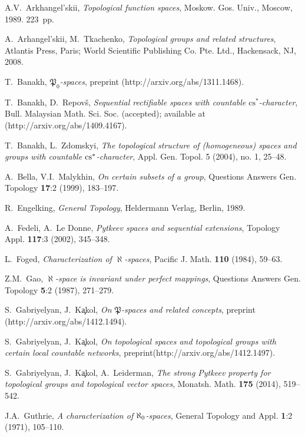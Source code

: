 \documentclass{amsart}
\theoremstyle{definition}
\begin{document}
\begin{thebibliography}{}

  A.V.~Arkhangel'skii, {\em Topological function spaces}, Moskow. Gos. Univ., Moscow, 1989. 223~pp.

 A.~Arhangel'skii, M.~Tkachenko, {\em Topological groups and related structures},  Atlantis Press, Paris; World Scientific Publishing Co. Pte. Ltd., Hackensack, NJ, 2008.

 T.~Banakh, {\em ${\mathfrak P}_0$-spaces}, preprint (http://arxiv.org/abs/1311.1468).

 T.~Banakh, D.~Repov\v s, {\em Sequential rectifiable spaces with countable ${\mathrm{cs}}^*$-character}, Bull. Malaysian Math. Sci. Soc. (accepted); available at (http://arxiv.org/abs/1409.4167).

 T.~Banakh, L.~Zdomskyi, {\em The topological structure of (homogeneous) spaces and groups with countable $\rm cs\sp *$-character}, Appl. Gen. Topol. 5 (2004), no. 1, 25--48.

 A.~Bella, V.I.~Malykhin, {\em On certain subsets of a group}, Questions Answers Gen. Topology {\bf 17}:2 (1999), 183--197.

 R.~Engelking, {\em General Topology}, Heldermann Verlag, Berlin, 1989.

 A.~Fedeli, A.~Le Donne, {\em Pytkeev spaces and sequential extensions},
Topology Appl. {\bf 117}:3 (2002), 345--348.

 L.~Foged, {\em Characterization of $\aleph$-spaces},  Pacific J. Math. \textbf{110} (1984),  59--63.

 Z.M.~Gao, {\em $\aleph$-space is invariant under perfect mappings}, Questions Answers Gen. Topology {\bf 5}:2 (1987), 271--279.

 S.~Gabriyelyan, J.~K\c akol, {\em On $\mathfrak{P}$-spaces and related concepts}, preprint (http://arxiv.org/abs/1412.1494).

 S.~Gabriyelyan, J.~K\c akol, {\em On topological spaces and topological groups with certain local countable networks}, preprint\newline (http://arxiv.org/abs/1412.1497).

 S.~Gabriyelyan, J.~K\c akol, A.~Leiderman, {\em The strong Pytkeev property for topological groups and topological vector spaces}, Monatsh. Math. {\bf 175} (2014), 519--542.

 J.A.~Guthrie, {\em A characterization of $\aleph \sb{0}$-spaces}, General Topology and Appl. {\bf 1}:2 (1971), 105--110.


\end{thebibliography}
\end{document}
